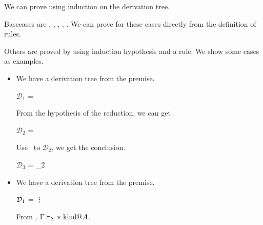 We can prove using induction on the derivation tree.

Basecases are \KVar, \TVar, \QKRefl, \QTRefl, \QRefl.
We can prove for these cases directly from the definition of rules.

Others are proved by using induction hypothesis and a rule. We show some cases as examples.
\begin{itemize}
	\item \KCsp
	      	      	      
	      We have a derivation tree from the premise.
	      	      	      
	      $\mathcal{D}_1$ = 
	      {}
	      	      	      
	      From the hypothesis of the reduction, we can get
	      	      	      
	      $\mathcal{D}_2$ = 
	      	      	      
	      Use \WCsp\ to $\mathcal{D}_2$, we get the conclusion.
	      	      	      
	      $\mathcal{D}_3$ = 
	      {_2}
	      	      	      
	\item \KTW
	      	      	      
	      We have a derivation tree from the premise.
	      	      	      
	      $\mathcal{D}_1$ = 
	      {\vdots}
	      	      	      
	      From \WStar, $\Gamma\vdash_\Sigma * \text{\ kind} @A$.
	      	      	      
\end{itemize}

